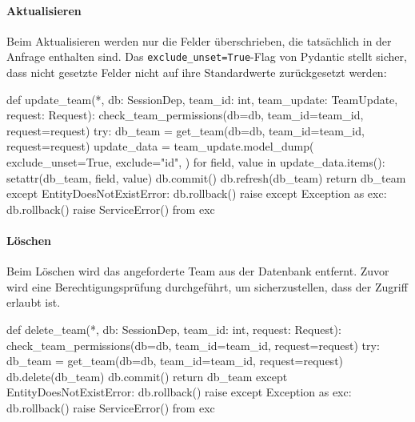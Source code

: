 \newpage

\paragraph{Aktualisieren}

Beim Aktualisieren werden nur die Felder überschrieben, die 
tatsächlich in der Anfrage enthalten sind. Das 
\texttt{exclude\_unset=True}-Flag von Pydantic stellt sicher, 
dass nicht gesetzte Felder nicht auf ihre Standardwerte 
zurückgesetzt werden:

\begin{CodeBox}[language=Python, caption={Aktualisieren eines Teams}]
def update_team(*, db: SessionDep, team_id: int,
                team_update: TeamUpdate, request: Request):
    check_team_permissions(db=db, team_id=team_id, request=request)
    try:
        db_team = get_team(db=db, team_id=team_id, request=request)
        update_data = team_update.model_dump(
            exclude_unset=True,
            exclude={"id"},
        )
        for field, value in update_data.items():
            setattr(db_team, field, value)
        db.commit()
        db.refresh(db_team)
        return db_team
    except EntityDoesNotExistError:
        db.rollback()
        raise
    except Exception as exc:
        db.rollback()
        raise ServiceError() from exc
\end{CodeBox}

\newpage

\paragraph{Löschen}

Beim Löschen wird das angeforderte Team aus der Datenbank entfernt.
Zuvor wird eine Berechtigungsprüfung durchgeführt, um sicherzustellen, dass der Zugriff erlaubt ist.

\begin{CodeBox}[language=Python, caption={Löschen eines Teams mit Vorabprüfung}]
def delete_team(*, db: SessionDep, team_id: int, request: Request):
    check_team_permissions(db=db, team_id=team_id, request=request)
    try:
        db_team = get_team(db=db, team_id=team_id, request=request)
        db.delete(db_team)
        db.commit()
        return db_team
    except EntityDoesNotExistError:
        db.rollback()
        raise
    except Exception as exc:
        db.rollback()
        raise ServiceError() from exc
\end{CodeBox}

